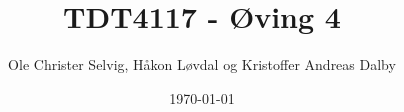 \documentclass[a4paper, norsk, 10pt]{article}
\begin{document}
\title{TDT4117 - Øving 4}
\author{Ole Christer Selvig, Håkon Løvdal og Kristoffer Andreas Dalby}
\date{\today}
\maketitle
\thispagestyle{empty}

\pagebreak




\end{document}
